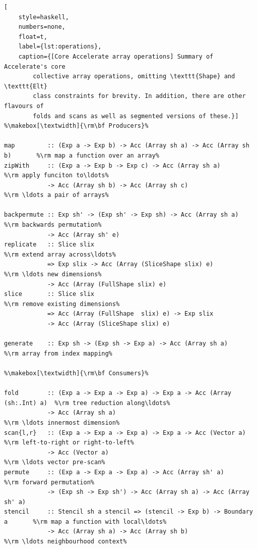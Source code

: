 \begin{lstlisting}[
    style=haskell,
    numbers=none,
    float=t,
    label={lst:operations},
    caption={[Core Accelerate array operations] Summary of Accelerate's core
        collective array operations, omitting \texttt{Shape} and \texttt{Elt}
        class constraints for brevity. In addition, there are other flavours of
        folds and scans as well as segmented versions of these.}]
%\makebox[\textwidth]{\rm\bf Producers}%

map         :: (Exp a -> Exp b) -> Acc (Array sh a) -> Acc (Array sh b)       %\rm map a function over an array%
zipWith     :: (Exp a -> Exp b -> Exp c) -> Acc (Array sh a)                  %\rm apply funciton to\ldots%
            -> Acc (Array sh b) -> Acc (Array sh c)                           %\rm \ldots a pair of arrays%

backpermute :: Exp sh' -> (Exp sh' -> Exp sh) -> Acc (Array sh a)             %\rm backwards permutation%
            -> Acc (Array sh' e)
replicate   :: Slice slix                                                     %\rm extend array across\ldots%
            => Exp slix -> Acc (Array (SliceShape slix) e)                    %\rm \ldots new dimensions%
            -> Acc (Array (FullShape slix) e)
slice       :: Slice slix                                                     %\rm remove existing dimensions%
            => Acc (Array (FullShape  slix) e) -> Exp slix
            -> Acc (Array (SliceShape slix) e)

generate    :: Exp sh -> (Exp sh -> Exp a) -> Acc (Array sh a)                %\rm array from index mapping%

%\makebox[\textwidth]{\rm\bf Consumers}%

fold        :: (Exp a -> Exp a -> Exp a) -> Exp a -> Acc (Array (sh:.Int) a)  %\rm tree reduction along\ldots%
            -> Acc (Array sh a)                                               %\rm \ldots innermost dimension%
scan{l,r}   :: (Exp a -> Exp a -> Exp a) -> Exp a -> Acc (Vector a)           %\rm left-to-right or right-to-left%
            -> Acc (Vector a)                                                 %\rm \ldots vector pre-scan%
permute     :: (Exp a -> Exp a -> Exp a) -> Acc (Array sh' a)                 %\rm forward permutation%
            -> (Exp sh -> Exp sh') -> Acc (Array sh a) -> Acc (Array sh' a)
stencil     :: Stencil sh a stencil => (stencil -> Exp b) -> Boundary a       %\rm map a function with local\ldots%
            -> Acc (Array sh a) -> Acc (Array sh b)                           %\rm \ldots neighbourhood context%
\end{lstlisting}

